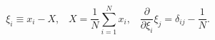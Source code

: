 \begin{equation}
	\xi_{i} \equiv x_{i}-X,\; \; \;
	X=\frac{1}{N}\sum_{i=1}^{N}x_i,\; \; \;
	\frac{\partial}{\partial \xi_{i}}\xi_{j}=\delta_{ij}-\frac{1}{N}.  
\end{equation}

